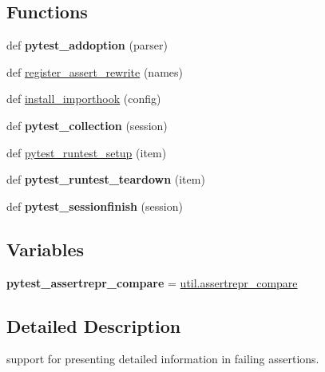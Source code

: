 \subsection*{Functions}
\begin{DoxyCompactItemize}
\item 
\mbox{\label{namespace__pytest_1_1assertion_abd34d536f9e3973b0a414084fd0bd1cd}} 
def {\bfseries pytest\+\_\+addoption} (parser)
\item 
def \hyperlink{namespace__pytest_1_1assertion_ae67a9be38000c6db37ac5f7775e6ad33}{register\+\_\+assert\+\_\+rewrite} (names)
\item 
def \hyperlink{namespace__pytest_1_1assertion_a00eeb8dd8f386c69e73741d12ab8a204}{install\+\_\+importhook} (config)
\item 
\mbox{\label{namespace__pytest_1_1assertion_a10ddb14226a7de70aad1e6ce96e29537}} 
def {\bfseries pytest\+\_\+collection} (session)
\item 
def \hyperlink{namespace__pytest_1_1assertion_a22e8b90bf006e6950f78877966756b8f}{pytest\+\_\+runtest\+\_\+setup} (item)
\item 
\mbox{\label{namespace__pytest_1_1assertion_a2863cf908b2859f16f427bb0f0a6c1fc}} 
def {\bfseries pytest\+\_\+runtest\+\_\+teardown} (item)
\item 
\mbox{\label{namespace__pytest_1_1assertion_aadd1ba63417bb9cf5cf657e1135ed606}} 
def {\bfseries pytest\+\_\+sessionfinish} (session)
\end{DoxyCompactItemize}
\subsection*{Variables}
\begin{DoxyCompactItemize}
\item 
\mbox{\label{namespace__pytest_1_1assertion_acf92d3c13ae1a80c7908517eec88f87c}} 
{\bfseries pytest\+\_\+assertrepr\+\_\+compare} = \hyperlink{namespace__pytest_1_1assertion_1_1util_a0d808117a2ab9db3c81e7bf8c2e2fe0c}{util.\+assertrepr\+\_\+compare}
\end{DoxyCompactItemize}


\subsection{Detailed Description}
\begin{DoxyVerb}support for presenting detailed information in failing assertions.
\end{DoxyVerb}
 

